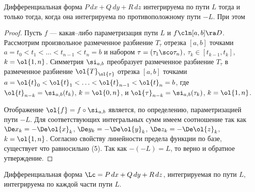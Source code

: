 \documentclass[a4paper]{article}
\begin{document}
\begin{theorem}
Дифференциальная форма $P\,dx+Q\,dy+R\,dz$ интегрируема по пути $L$
тогда и только тогда, когда она интегрируема по противоположному
пути $-L$. При этом 
\end{theorem}

\begin{proof}
Пусть $f$ --- какая--либо параметризация пути $L$ и $f\cln[a,b]\ra
D$. Рассмотрим произвольное размеченное разбиение $T_{\tau}$ отрезка
$[a,b]$ точками $a=t_0<t_1<\ldots<t_{n-1}<t_n=b$ и набором
$\tau=(\tau_1 \sco \tau_n)$, $\tau_k\in[t_{k-1},t_k]$, $k=\ol{1,n}$.
Симметрия $\si_{a,b}$ преобразует размеченное разбиение $T_{\tau}$ в
размеченное разбиение $\ol{T}_{\ol{\tau}}$ отрезка $[a,b]$ точками
$a=\ol{t}_0 < \ol{t}_1 < \ldots < \ol{t}_{n-1} < \ol{t}_n = b$, где
$\ol{t}_{n-k}=\si_{a,b}(t_k)$, $k=\ol{0,n}$, и $\ol{\tau}_{n-k} =
\si_{a,b}(\tau_k)$, $k=\ol{1,n}$.

Отображение $\ol{f}=f\circ\si_{a,b}$ является, по определению,
параметризацией пути $-L$. Для соответствующих интегральных сумм
имеем соотношение  так как $\De x_k = -\De \ol{x}_k$, $\De
y_k = -\De \ol{y}_k$, $\De z_k = -\De \ol{z}_k$, $k=\ol{1,n}$.
Согласно свойству линейности предела функции по базе, существует
что равносильно (5). Так как $-(-L)=L$, то верно и обратное
утверждение.
\end{proof}

\begin{theorem}
\label{thm223} Дифференциальная форма $\Lc=P\,dx+Q\,dy+R\,dz$,
интегрируемая по пути $L$, интегрируема по каждой части пути $L$.
\end{theorem}
\end{document}
